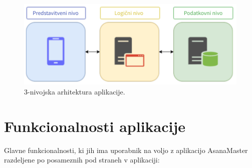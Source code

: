 \documentclass[a4paper, 12pt]{book}
\begin{document}
\begin{figure}[htbp]
\begin{center}
\includegraphics[scale=0.9]{arhitektura.png}
\end{center}
\caption{3-nivojska arhitektura aplikacije.}
\label{arh}
\end{figure}


\section{Funkcionalnosti aplikacije}
Glavne funkcionalnosti, ki jih ima uporabnik na voljo z aplikacijo AsanaMaster razdeljene po posameznih pod straneh v aplikaciji:
\end{document}
